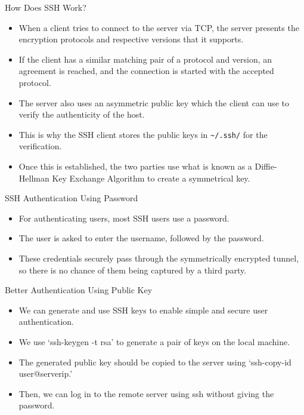 \begin{frame}[fragile]{How Does SSH Work?}

\begin{itemize}
	\item When a client tries to connect to the server via TCP, the server presents the encryption protocols and respective versions that it supports. 
	\item If the client has a similar matching pair of a protocol and version, an agreement is reached, and the connection is started with the accepted protocol.
\end{itemize}
\end{frame}

\begin{frame}[fragile]{}

\begin{itemize}
	\item The server also uses an asymmetric public key which the client can use to verify the authenticity of the host.
	\item This is why the SSH client stores the public keys in \verb|~/.ssh/| for the verification.
	\item Once this is established, the two parties use what is known as a Diffie-Hellman Key Exchange Algorithm to create a symmetrical key.
\end{itemize}
\end{frame}

\begin{frame}[fragile]{SSH Authentication Using Password}

\begin{itemize}
	\item For authenticating users, most SSH users use a password.
	\item The user is asked to enter the username, followed by the password. 
	\item These credentials securely pass through the symmetrically encrypted tunnel, so there is no chance of them being captured by a third party.
\end{itemize}
\end{frame}

\begin{frame}[fragile]{Better Authentication Using Public Key}

\begin{itemize}
	\item We can generate and use SSH keys to enable simple and secure user authentication.
	\item We use `ssh-keygen -t rsa' to generate a pair of keys on the local machine. 
	\item The generated public key should be copied to the server using `ssh-copy-id user@serverip.'
	\item Then, we can log in to the remote server using ssh without giving the password. 
\end{itemize}

\end{frame}

